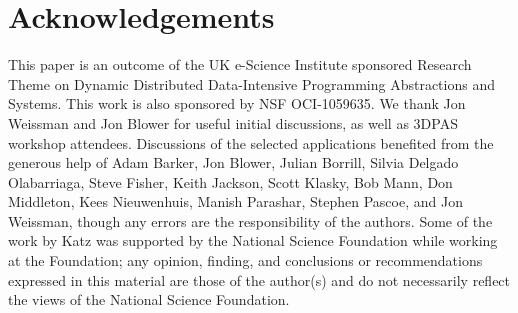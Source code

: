 





\section*{Acknowledgements}
This paper is an outcome of the UK e-Science Institute sponsored
Research Theme on Dynamic Distributed Data-Intensive Programming
Abstractions and Systems. This work is also sponsored by NSF
OCI-1059635.  We thank Jon Weissman and Jon Blower for useful initial
discussions, as well as 3DPAS workshop attendees. Discussions of the
selected applications benefited from the generous help of
Adam Barker,
Jon Blower,
Julian Borrill,
Silvia Delgado Olabarriaga,
Steve Fisher,
Keith Jackson,
Scott Klasky,
Bob Mann,
Don Middleton,
Kees Nieuwenhuis,
Manish Parashar,
Stephen Pascoe,
and
Jon Weissman,
though any errors are the responsibility of the authors.
Some of the work by Katz was
supported by the National Science Foundation while working at the
Foundation; any opinion, finding, and conclusions or recommendations
expressed in this material are those of the author(s) and do not
necessarily reflect the views of the National Science Foundation.

